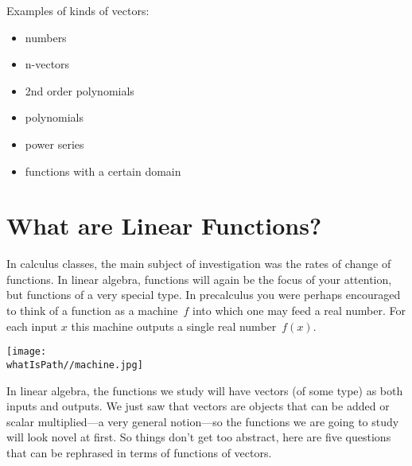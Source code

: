 \noindent 
Examples of kinds of vectors:\\
\begin{itemize}
\item numbers
\item n-vectors
\item 2nd order polynomials
\item polynomials
\item power series
\item functions with a certain domain
\end{itemize}



\section{What are Linear Functions?}
\label{LTs}

In calculus classes, the main subject of investigation was the rates of change of functions. 
In linear algebra, functions
will again be the focus of your attention, 
but functions of a very special type. 
In precalculus you 
were perhaps encouraged to think of a function as a machine~$f$
into which one may feed a real number. 
For each input $x$ this machine outputs a single real number~$f(x)$. 

\begin{center}
\texttt{[image: \\whatIsPath//machine.jpg]}
\end{center}

In linear algebra, the functions we study will have vectors (of some type) as both inputs and outputs. 
We just saw that vectors are objects that can be added or scalar multiplied---a very general notion---so the functions we are going to study will look novel at first. 
So things don't get too abstract, here are five questions that can be rephrased in terms of functions of vectors.

